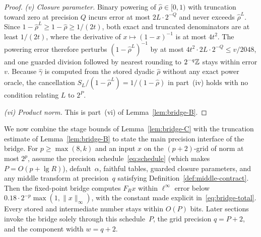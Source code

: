 \begin{proof}
\emph{(v) Closure parameter.} Binary powering of $\hat\rho\in[0,1)$ with truncation toward zero at precision $Q$ incurs
error at most $2L\cdot 2^{-Q}$ and never exceeds $\hat\rho^L$. Since $1-\hat\rho^L\ge 1-\hat\rho\ge 1/(2t)$, both exact
and truncated denominators are at least $1/(2t)$, where the derivative of $x\mapsto(1-x)^{-1}$ is at most $4t^2$. The
powering error therefore perturbs $(1-\hat\rho^L)^{-1}$ by at most $4t^2\cdot 2L\cdot 2^{-Q}\le v/2048$, and one guarded
division followed by nearest rounding to $2^{-q}\mathbb{Z}$ stays within error $v$. Because $\hat\gamma$ is computed from the
stored dyadic $\hat\rho$ without any exact power oracle, the cancellation $S_L/(1-\hat\rho^L)=1/(1-\hat\rho)$ in
part~(iv) holds with no condition relating $L$ to $2^P$.

\emph{(vi) Product norm.} This is part~(vi) of Lemma~\ref{lem:bridge-B}.
\end{proof}

We now combine the stage bounds of Lemma~\ref{lem:bridge-C} with the truncation estimate of Lemma~\ref{lem:bridge-B} to
state the main precision interface of the bridge. For $p\ge\max(8,k)$ and an input $x$ on the $(p+2)$-grid of norm at
most $2^p$, assume the precision schedule~\eqref{eq:schedule} (which makes $P=O(p+\lg R)$), default~$\alpha$, faithful
tables, guarded closure parameters, and any middle transform at precision~$q$ satisfying
Definition~\ref{def:middle-contract}. Then the fixed-point bridge computes $F_R x$ within $\ell^\infty$ error below
$0.18\cdot 2^{-p}\max(1,\|x\|_\infty)$, with the constant made explicit in~\eqref{eq:bridge-total}. Every stored and
intermediate number stays within $O(P)$ bits. Later sections invoke the bridge solely through this schedule~$P$, the grid
precision $q=P+2$, and the component width $w=q+2$.

